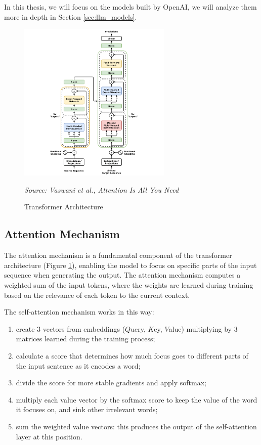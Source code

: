 In this thesis, we will focus on the models built by OpenAI, we will analyze them
more in depth in Section \ref{sec:llm_models}.

\begin{figure}[ht!]
  \centering
  \includegraphics[width=0.65\textwidth]{images/transformer_architecture.png}
  \caption{Transformer Architecture}
  {\emph{Source: Vaswani et al., Attention Is All You Need \cite{vaswani2023attentionneed}}}
  \label{fig:transformer_architecture}
\end{figure}

\subsection{Attention Mechanism}
\label{sub:attention_mechanism}

The attention mechanism is a fundamental component of the transformer architecture
(Figure \ref{fig:transformer_architecture}), enabling the model to focus on
specific parts of the input sequence when generating the output. The attention mechanism
computes a weighted sum of the input tokens, where the weights are learned
during training based on the relevance of each token to the current context.

The self-attention mechanism works in this way:
\begin{enumerate}
  \item create 3 vectors from embeddings ($Q$uery, $K$ey, $V$alue) multiplying
    by 3 matrices learned during the training process;

  \item calculate a score that determines how much focus goes to different parts
    of the input sentence as it encodes a word;

  \item divide the score for more stable gradients and apply softmax;

  \item multiply each value vector by the softmax score to keep the value of the
    word it focuses on, and sink other irrelevant words;

  \item sum the weighted value vectors: this produces the output of the self-attention
    layer at this position.
\end{enumerate}

